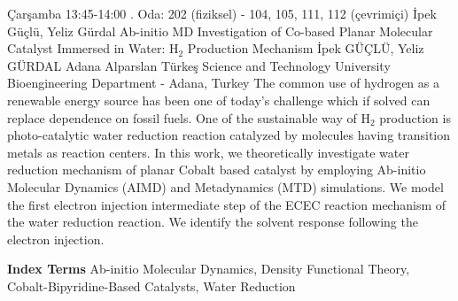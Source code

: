 
    \begin{abstract_basarim}
    {Çarşamba 13:45-14:00}
    {.}
    {Oda: 202 (fiziksel) - 104, 105, 111, 112 (çevrimiçi)}
    {İpek Güçlü, Yeliz Gürdal}
    {Ab-initio MD Investigation of Co-based Planar Molecular Catalyst Immersed in Water: $\mathrm{H}_{2}$ Production Mechanism}
    {%
    İpek GÜÇLÜ, Yeliz GÜRDAL}
    {%
    }
    {%
    Adana Alparslan Türkeş Science and Technology University Bioengineering Department - Adana, Turkey}
    The common use of hydrogen as a renewable energy source has been one of today's challenge which if solved can replace dependence on fossil fuels. One of the sustainable way of $\mathrm{H}_{2}$ production is photo-catalytic water reduction reaction catalyzed by molecules having transition metals as reaction centers. In this work, we theoretically investigate water reduction mechanism of planar Cobalt based catalyst by employing Ab-initio Molecular Dynamics (AIMD) and Metadynamics (MTD) simulations. We model the first electron injection intermediate step of the ECEC reaction mechanism of the water reduction reaction. We identify the solvent response following the electron injection. 
    
            \textbf{Index Terms} \newline{}Ab-initio Molecular Dynamics, Density Functional Theory, Cobalt-Bipyridine-Based Catalysts, Water Reduction
    \end{abstract_basarim}
    
